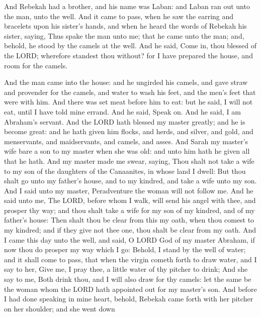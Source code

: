  And Rebekah had a brother, and his name was Laban: and
Laban ran out unto the man, unto the well.  And it came to
pass, when he saw the earring and bracelets upon his sister's hands, and
when he heard the words of Rebekah his sister, saying, Thus spake the
man unto me; that he came unto the man; and, behold, he stood by the
camels at the well.  And he said, Come in, thou blessed of
the LORD; wherefore standest thou without? for I have prepared the
house, and room for the camels.

 And the man came into the house: and he ungirded his
camels, and gave straw and provender for the camels, and water to wash
his feet, and the men's feet that were with him.  And there
was set meat before him to eat: but he said, I will not eat, until I
have told mine errand. And he said, Speak on.  And he said,
I am Abraham's servant.  And the LORD hath blessed my
master greatly; and he is become great: and he hath given him flocks,
and herds, and silver, and gold, and menservants, and maidservants, and
camels, and asses.  And Sarah my master's wife bare a son
to my master when she was old: and unto him hath he given all that he
hath.  And my master made me swear, saying, Thou shalt not
take a wife to my son of the daughters of the Canaanites, in whose land
I dwell:  But thou shalt go unto my father's house, and to
my kindred, and take a wife unto my son.  And I said unto
my master, Peradventure the woman will not follow me.  And
he said unto me, The LORD, before whom I walk, will send his angel with
thee, and prosper thy way; and thou shalt take a wife for my son of my
kindred, and of my father's house:  Then shalt thou be
clear from this my oath, when thou comest to my kindred; and if they
give not thee one, thou shalt be clear from my oath.  And I
came this day unto the well, and said, O LORD God of my master Abraham,
if now thou do prosper my way which I go:  Behold, I stand
by the well of water; and it shall come to pass, that when the virgin
cometh forth to draw water, and I say to her, Give me, I pray thee, a
little water of thy pitcher to drink;  And she say to me,
Both drink thou, and I will also draw for thy camels: let the same be
the woman whom the LORD hath appointed out for my master's son.
 And before I had done speaking in mine heart, behold,
Rebekah came forth with her pitcher on her shoulder; and she went down

